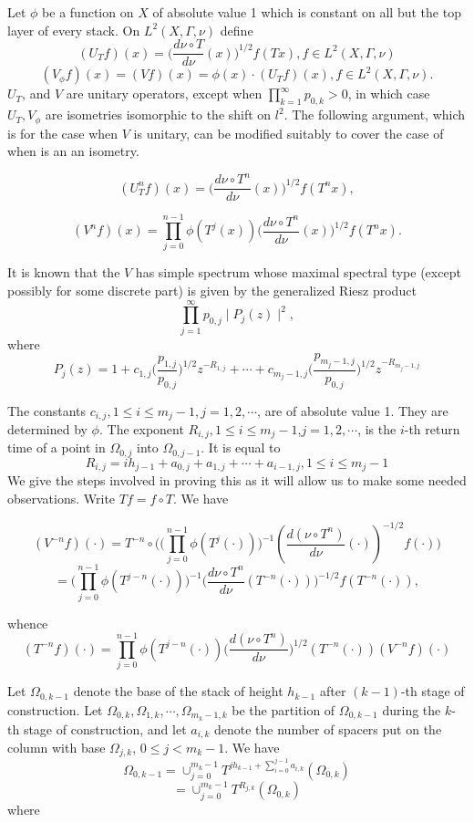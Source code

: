 \documentclass{amsart}
\theoremstyle{definition}
\theoremstyle{remark}
\numberwithin{equation}{section}
\newcommand{\1}{\mathbb{1}}
\begin{document}
Let $\phi$ be a function on $X$ of absolute value 1 which is constant  on all but the top layer of every stack. On $L^2(X, \Gamma,\nu)$ define
$$(U_T f)(x)  = \Big(\frac{d\nu\circ T}{d\nu}(x)\Big)^{1/2} f(Tx), f \in L^2(X, \Gamma , \nu)$$
$$(V_\phi f)(x)  = (Vf)(x) = \phi(x)\cdot (U_Tf)(x), f \in L^2(X, \Gamma, \nu).$$
$U_T$, and $V$ are unitary operators, except  when $\prod_{k=1}^\infty p_{0,k} > 0$, in which case
$U_T, V_\phi$ are isometries isomorphic to the shift on $l^2$. The following argument,
which is for the case when $V$ is unitary, can be modified suitably to cover the case
of when is an an isometry.

$$(U^n_Tf)(x) = \Big(\frac{d\nu\circ T^n}{d\nu}(x)\Big)^{1/2}f(T^nx),$$

$$(V^nf)(x)=\prod_{j=0}^{n-1}\phi(T^j(x))\Big(\frac{d\nu\circ T^n}{d\nu}(x)\Big)^{1/2}f(T^nx).$$

It is known \cite{Nadkarni1} that the $V$ has simple spectrum whose maximal spectral type (except possibly for some discrete part) is given by the generalized Riesz product
$$\prod_{j=1}^\infty p_{0,j}\mid P_j(z)\mid^2,$$
where
$$P_j(z) = 1 + c_{1,j}\Big(\frac{p_{1,j}}{p_{0,j}}\Big)^{1/2}z^{-R_{1,j}} +\cdots + c_{m_j-1,j}\Big(\frac{p_{m_j-1,j}}{p_{0,j}}\Big)^{1/2}z^{-R_{m_j-1,j}}$$

The constants $c_{i,j}, 1\leq i \leq m_j-1, j = 1,2,\cdots$, are of absolute value 1. They are determined by $\phi$. The exponent $R_{i,j}, 1 \leq i \leq m_j-1$,$ j =1,2,\cdots$, is the
$i$-th return time of a point in $\Omega_{0,j}$ into $\Omega_{0,j-1}$. It is equal to
$$R_{i,j} = ih_{j-1} + a_{0,j} + a_{1,j} + \cdots +a_{i-1,j}, 1 \leq i \leq m_{j}-1$$
We give the steps involved in proving this as it will allow us to make some needed observations. Write $Tf = f\circ T$. We have

$$(V^{-n}f)(\cdot) = T^{-n}\circ\Big(\Big(\prod_{j=0}^{n-1}\phi(T^j(\cdot))\Big)^{-1}(\frac{d(\nu\circ T^n)}{d\nu}(\cdot))^{-1/2}f(\cdot)\Big)$$
$$= \Big(\prod_{j=0}^{n-1}\phi (T^{j-n}(\cdot))\Big)^{-1}\Big(\frac{d\nu\circ T^n}{d\nu}(T^{-n}(\cdot))\Big)^{-1/2}f(T^{-n}(\cdot)),$$

whence
$$(T^{-n}f)(\cdot) =  \prod_{j=0}^{n-1}\phi (T^{j-n}(\cdot))\Big(\frac{d(\nu\circ T^n)}{d\nu}\Big)^{1/2}(T^{-n}(\cdot))(V^{-n}f)(\cdot)$$

Let $\Omega_{0,k-1}$ denote the base of the stack of height $h_{k-1}$ after $(k-1)$-th stage of construction. Let $\Omega_{0,k}, \Omega_{1,k}, \cdots, \Omega_{m_k-1, k}$ be the partition of $\Omega_{0,k-1}$ during the $k$-th stage of construction, and let $a_{i,k}$ denote the number of spacers put on the column with base $\Omega_{j, k}$, $0 \leq j < m_k-1$. We have
$$\Omega_{0,k-1} = \cup_{j=0}^{m_k-1}T^{jh_{k-1}+ \sum_{i=0}^{j-1}a_{i,k}}(\Omega_{0,k})$$
$$= \cup_{j=0}^{m_k-1}T^{R_{j,k}}(\Omega_{0,k})$$
where
\end{document}
